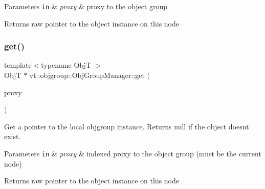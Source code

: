 \begin{DoxyParams}[1]{Parameters}
\mbox{\tt in}  & {\em proxy} & proxy to the object group\\
\hline
\end{DoxyParams}
\begin{DoxyReturn}{Returns}
raw pointer to the object instance on this node 
\end{DoxyReturn}
\mbox{\label{structvt_1_1objgroup_1_1_obj_group_manager_a70e5e1d0ada31d6f88a8ec88965df895}} 
\subsubsection{\texorpdfstring{get()}{get()}\hspace{0.1cm}{\footnotesize\ttfamily [2/2]}}
{\footnotesize\ttfamily template$<$typename ObjT $>$ \\
ObjT $\ast$ vt\+::objgroup\+::\+Obj\+Group\+Manager\+::get (\begin{DoxyParamCaption}\item[{\hyperlink{structvt_1_1objgroup_1_1_obj_group_manager_adba6c8ecb0f4c30e719f1abb995cfc9b}{Proxy\+Elm\+Type}$<$ ObjT $>$}]{proxy }\end{DoxyParamCaption})}



Get a pointer to the local objgroup instance. Returns null if the object doesn\textquotesingle{}t exist. 


\begin{DoxyParams}[1]{Parameters}
\mbox{\tt in}  & {\em proxy} & indexed proxy to the object group (must be the current node)\\
\hline
\end{DoxyParams}
\begin{DoxyReturn}{Returns}
raw pointer to the object instance on this node 
\end{DoxyReturn}
\mbox{\label{structvt_1_1objgroup_1_1_obj_group_manager_a9758d68a4656e7ff2eb1ac07b4feeeed}} 
